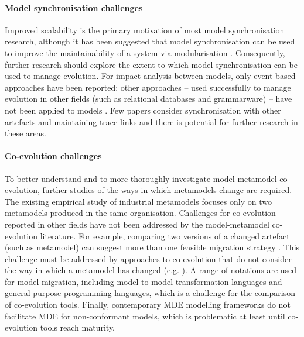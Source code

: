 \paragraph{Model synchronisation challenges} Improved \cc scalability is the primary motivation of most model synchronisation research, although it has been suggested that model synchronisation can be used to improve the maintainability of a system via modularisation \cite{fritzsche08tracing}. Consequently, further research should explore the extent to which model synchronisation can be used to manage evolution. For impact analysis between models, only event-based approaches have been reported; other approaches -- used successfully to manage evolution in other fields (such as relational databases and grammarware) -- have not been applied to models \cite{winkler09survey}. Few papers consider synchronisation with other artefacts and maintaining trace links and there is potential for further research in these areas.

\paragraph{Co-evolution challenges} To better understand and to more thoroughly investigate model-metamodel co-evolution, further studies of the ways in which metamodels change are required. The \cc existing empirical study of industrial metamodels \cite{herrmannsdoerfer08automatability} focuses only on two metamodels produced in the same organisation. Challenges for co-evolution reported in other fields have not been addressed by the model-metamodel co-evolution literature. For \cc example, comparing two versions of a changed artefact (such as metamodel) can suggest more than one feasible migration strategy \cite{lerner00model}. This challenge must be addressed by approaches to co-evolution that do not consider the way in which a metamodel has changed (e.g. \cite{cicchetti08automating,garces09managing}). A range of notations are used for model migration, including model-to-model transformation languages and general-purpose programming languages, which is a challenge for the comparison of co-evolution tools. Finally, contemporary MDE modelling frameworks do not facilitate MDE for non-conformant models, which is problematic at least until co-evolution tools reach maturity.  

